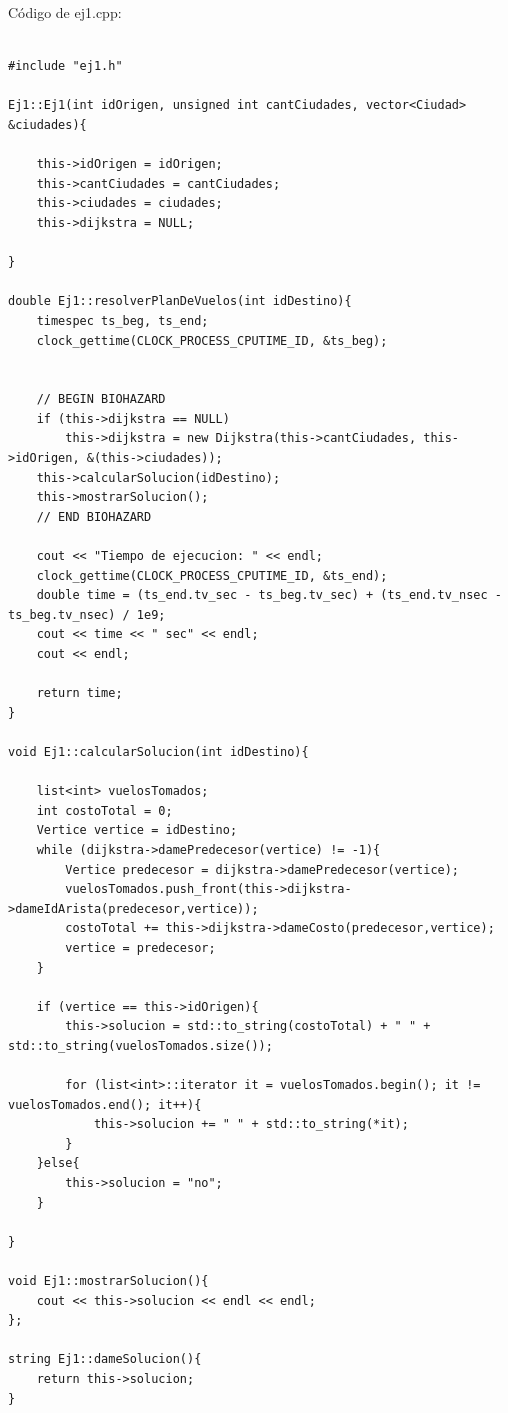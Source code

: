 \noindent
C\'odigo de ej1.cpp:

\begin{lstlisting}

#include "ej1.h"

Ej1::Ej1(int idOrigen, unsigned int cantCiudades, vector<Ciudad> &ciudades){

	this->idOrigen = idOrigen;
	this->cantCiudades = cantCiudades;
	this->ciudades = ciudades;
	this->dijkstra = NULL;

}

double Ej1::resolverPlanDeVuelos(int idDestino){
	timespec ts_beg, ts_end;
	clock_gettime(CLOCK_PROCESS_CPUTIME_ID, &ts_beg);


	// BEGIN BIOHAZARD
	if (this->dijkstra == NULL)
		this->dijkstra = new Dijkstra(this->cantCiudades, this->idOrigen, &(this->ciudades));
	this->calcularSolucion(idDestino);
	this->mostrarSolucion();
	// END BIOHAZARD

	cout << "Tiempo de ejecucion: " << endl;
	clock_gettime(CLOCK_PROCESS_CPUTIME_ID, &ts_end);
	double time = (ts_end.tv_sec - ts_beg.tv_sec) + (ts_end.tv_nsec - ts_beg.tv_nsec) / 1e9;
	cout << time << " sec" << endl;
	cout << endl;

	return time;
}

void Ej1::calcularSolucion(int idDestino){

	list<int> vuelosTomados;
	int costoTotal = 0;
	Vertice vertice = idDestino;
	while (dijkstra->damePredecesor(vertice) != -1){
		Vertice predecesor = dijkstra->damePredecesor(vertice);
		vuelosTomados.push_front(this->dijkstra->dameIdArista(predecesor,vertice));
		costoTotal += this->dijkstra->dameCosto(predecesor,vertice);
		vertice = predecesor;
	}

	if (vertice == this->idOrigen){
		this->solucion = std::to_string(costoTotal) + " " + std::to_string(vuelosTomados.size());

		for (list<int>::iterator it = vuelosTomados.begin(); it != vuelosTomados.end(); it++){
			this->solucion += " " + std::to_string(*it);
		}
	}else{
		this->solucion = "no";
	}

}

void Ej1::mostrarSolucion(){
	cout << this->solucion << endl << endl;
};

string Ej1::dameSolucion(){
	return this->solucion;
}

\end{lstlisting}
\bigskip


